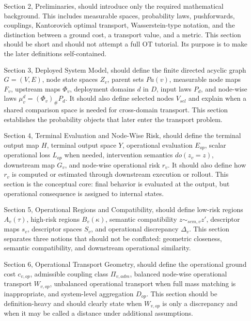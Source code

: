 \documentclass[11pt,a4paper]{article}
\begin{document}
Section 2, Preliminaries, should introduce only the required mathematical background. This includes measurable spaces, probability laws, pushforwards, couplings, Kantorovich optimal transport, Wasserstein-type notation, and the distinction between a ground cost, a transport value, and a metric. This section should be short and should not attempt a full OT tutorial. Its purpose is to make the later definitions self-contained.

Section 3, Deployed System Model, should define the finite directed acyclic graph \(G=(V,E)\), node state spaces \(Z_v\), parent sets \(Pa(v)\), measurable node maps \(F_v\), upstream maps \(\Phi_v\), deployment domains \(d\) in \(D\), input laws \(P_d\), and node-wise laws \(\mu_v^d = (\Phi_v)_\# P_d\). It should also define selected nodes \(V_{sel}\) and explain when a shared comparison space is needed for cross-domain transport. This section establishes the probability objects that later enter the transport problem.

Section 4, Terminal Evaluation and Node-Wise Risk, should define the terminal output map \(H\), terminal output space \(Y\), operational evaluation \(E_{op}\), scalar operational loss \(L_{op}\) when needed, intervention semantics \(do(z_v = z)\), downstream map \(G_v\), and node-wise operational risk \(r_v\). It should also define how \(r_v\) is computed or estimated through downstream execution or rollout. This section is the conceptual core: final behavior is evaluated at the output, but operational consequence is assigned to internal states.

Section 5, Operational Regions and Compatibility, should define low-risk regions \(A_v(\tau)\), high-risk regions \(B_v(\kappa)\), semantic compatibility \(z \sim_{sem,v} z'\), descriptor maps \(s_v\), descriptor spaces \(S_v\), and operational discrepancy \(\Delta_v\). This section separates three notions that should not be conflated: geometric closeness, semantic compatibility, and downstream operational similarity.

Section 6, Operational Transport Geometry, should define the operational ground cost \(c_{v,op}\), admissible coupling class \(\Pi_{v,adm}\), balanced node-wise operational transport \(W_{v,op}\), unbalanced operational transport when full mass matching is inappropriate, and system-level aggregation \(D_{op}\). This section should be definition-heavy and should clearly state when \(W_{v,op}\) is only a discrepancy and when it may be called a distance under additional assumptions.
\end{document}
